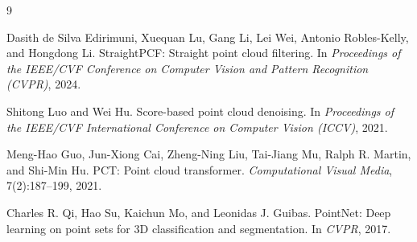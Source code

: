 \documentclass{article}
\begin{document}
\begin{thebibliography}{9}

Dasith de Silva Edirimuni, Xuequan Lu, Gang Li, Lei Wei, Antonio Robles-Kelly, and Hongdong Li.
\newblock StraightPCF: Straight point cloud filtering.
\newblock In \emph{Proceedings of the IEEE/CVF Conference on Computer Vision and Pattern Recognition (CVPR)}, 2024.

Shitong Luo and Wei Hu.
\newblock Score-based point cloud denoising.
\newblock In \emph{Proceedings of the IEEE/CVF International Conference on Computer Vision (ICCV)}, 2021.

Meng-Hao Guo, Jun-Xiong Cai, Zheng-Ning Liu, Tai-Jiang Mu, Ralph R. Martin, and Shi-Min Hu.
\newblock PCT: Point cloud transformer.
\newblock \emph{Computational Visual Media}, 7(2):187--199, 2021.

Charles R. Qi, Hao Su, Kaichun Mo, and Leonidas J. Guibas.
\newblock PointNet: Deep learning on point sets for 3D classification and segmentation.
\newblock In \emph{CVPR}, 2017.

\end{thebibliography}
\end{document}
